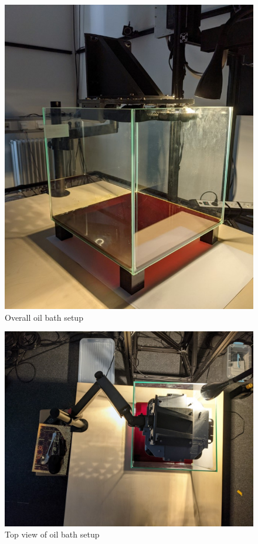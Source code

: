 \begin{figure}[htb]
	\includegraphics[width=\textwidth]{gfx/oilbath1.jpg}
	\caption{Overall oil bath setup}
	\label{fig:validation:oil_bath1}
\end{figure}

\begin{figure}[htb]
	\includegraphics[width=\textwidth]{gfx/oilbath2.jpg}
	\caption{Top view of oil bath setup }
	\label{fig:validation:oil_bath2}
\end{figure}